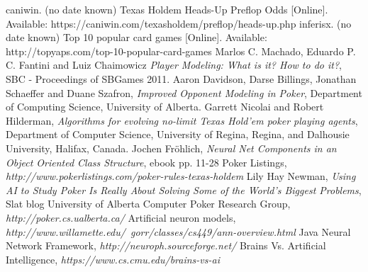 \begin{thebibliography}{100} 
 caniwin. (no date known) Texas Holdem Heads-Up Preflop Odds [Online]. Available: https://caniwin.com/texasholdem/preflop/heads-up.php
 inferisx. (no date known) Top 10 popular card games [Online]. Available: http://topyaps.com/top-10-popular-card-games
 Marlos C. Machado, Eduardo P. C. Fantini and Luiz Chaimowicz \emph{Player Modeling: What is it? How to do it?}, SBC - Proceedings of SBGames 2011.
 Aaron Davidson, Darse Billings, Jonathan Schaeffer and Duane Szafron, \emph{Improved Opponent Modeling in Poker},
Department of Computing Science, University of Alberta.
 Garrett Nicolai and Robert Hilderman, \emph{Algorithms for evolving no-limit Texas Hold'em poker playing agents}, Department of Computer Science, University of Regina, Regina, and Dalhousie University, Halifax, Canada.
 Jochen Fröhlich, \emph {Neural Net Components in an Object Oriented Class Structure}, 
ebook pp. 11-28
 Poker Listings, \emph {http://www.pokerlistings.com/poker-rules-texas-holdem}
 Lily Hay Newman, \emph{Using AI to Study Poker Is Really About Solving Some of the World’s Biggest Problems}, 
Slat blog
 University of Alberta Computer Poker Research Group, \emph{http://poker.cs.ualberta.ca/}
 Artificial neuron models, \emph{http://www.willamette.edu/~gorr/classes/cs449/ann-overview.html}
 Java Neural Network Framework, \emph{http://neuroph.sourceforge.net/}
 Brains Vs. Artificial Intelligence, \emph{https://www.cs.cmu.edu/brains-vs-ai}
\end{thebibliography}